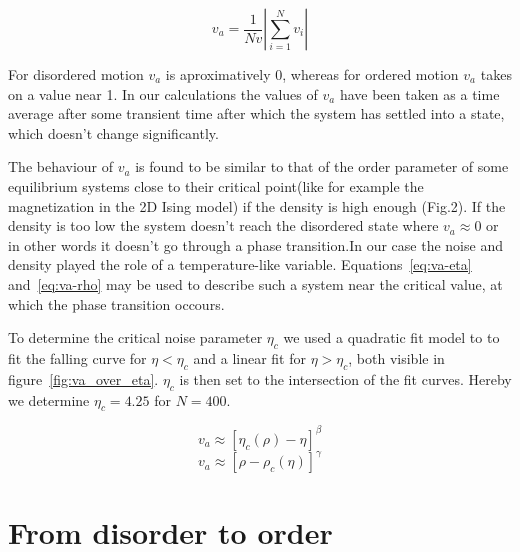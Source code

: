 \documentclass[twoside,twocolumn]{article}
\begin{document}
\begin{equation}
v_a=\frac{1}{Nv}\left\vert\sum_{i=1}^{N} v_i\right\vert
\end{equation}

For disordered motion $v_a$ is aproximatively 0, whereas for ordered motion $v_a$ takes on a value near 1.
In our calculations the values of $v_a$ have been taken as a time average after some transient time after which the system has settled into a state, which doesn't change significantly.


The behaviour of $v_a$ is found to be similar to that of the order parameter of some equilibrium systems close to their critical point(like for example the magnetization in the 2D Ising model) if the density is high enough (Fig.2).
If the density is too low the system doesn't reach the disordered state where $v_a\approx 0$ or in other words it doesn't go through a phase transition.In our case the noise and density played the role of a temperature-like variable. Equations~\eqref{eq:va-eta} and~\eqref{eq:va-rho} may be used to describe such a system near the critical value, at which the phase transition occours. 


To determine the critical noise parameter $\eta_c$ we used a quadratic fit model
to to fit the falling curve for $\eta < \eta_c$ and a linear fit for $\eta > 
\eta_c$, both visible in figure~\ref{fig:va_over_eta}. $\eta_c$ is then set to 
the intersection of the fit curves. Hereby we determine $\eta_c = 4.25$ for $N=400$.


\begin{equation}
  \label{eq:va-eta}
  v_a \approx{[\eta_c(\rho)-\eta]}^\beta 
\end{equation}
\begin{equation}
  \label{eq:va-rho}
  v_a \approx{\left[\rho-\rho_c (\eta)\right]}^\gamma
\end{equation}



\section{From disorder to order}
\end{document}
